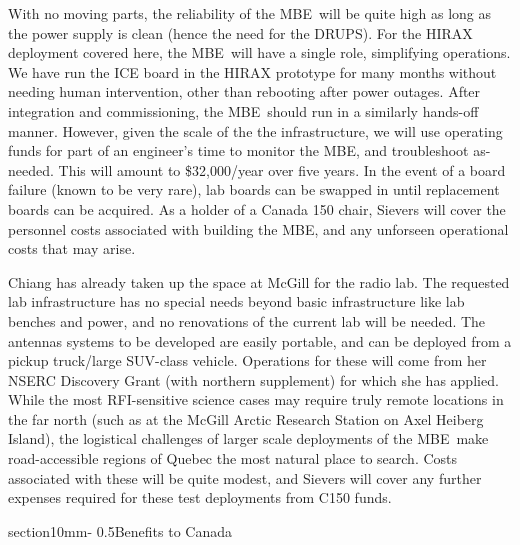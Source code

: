 \documentclass[letterpaper,11pt,preprint]{aastex}
\makeatletter
\newcommand{\mbe}{{\rm MBE}}
\renewcommand{\section}{\@startsection%
{section}{1}{0mm}{-\baselineskip}%
{0.5\baselineskip}{\normalfont\Large\bfseries}}%
\makeatother
\begin{document}
With no moving parts, the reliability of the \mbe\ will be quite high
as long as the power supply is clean (hence the need for the DRUPS).
For the HIRAX deployment covered here, the \mbe\ will have a single
role, simplifying operations.  We have run the ICE board in the HIRAX
prototype for many months without needing human intervention, other
than rebooting after power outages.  After integration and
commissioning, the \mbe\ should run in a similarly hands-off manner.
However, given the scale of the the infrastructure, we will use
operating funds for part of an engineer's time to monitor the \mbe,
and troubleshoot as-needed.  This will amount to \$32,000/year over
five years.  In the event of a board failure (known to
be very rare), lab boards can be swapped in until replacement boards
can be acquired.  As a holder of a Canada 150 chair, Sievers will
cover the personnel costs associated with building the \mbe, and any
unforseen operational costs that may arise.

Chiang has already taken up the space at McGill for the radio lab.
The requested lab infrastructure has no special needs beyond basic
infrastructure like lab benches and power, and no renovations of the
current lab will be needed.  The antennas systems to be developed are
easily portable, and can be deployed from a pickup truck/large
SUV-class vehicle.  Operations for these will come from her NSERC
Discovery Grant (with northern supplement) for which she has applied.
While the most RFI-sensitive science cases may require truly remote
locations in the far north (such as at the McGill Arctic Research
Station on Axel Heiberg Island), the logistical challenges of larger
scale deployments of the \mbe\ make road-accessible regions of Quebec
the most natural place to search.  Costs associated with these will be
quite modest, and Sievers will cover any further expenses required for
these test deployments from C150 funds.


\section{Benefits to Canada}
\end{document}
